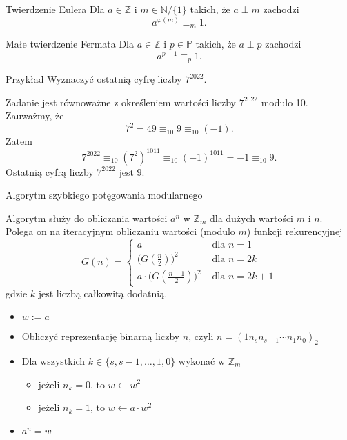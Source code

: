 \documentclass[a4paper,10pt]{beamer}
\begin{document}
\begin{frame}
	
	\begin{block}{Twierdzenie Eulera}
		Dla $a\in\mathbb{Z}$ i $m\in\mathbb{N}/\{1\}$ takich, że $a\perp m$ zachodzi
		$$a^{\varphi(m)}\equiv_m1.$$
	\end{block}

	\begin{block}{Małe twierdzenie Fermata}
		Dla $a\in\mathbb{Z}$ i $p\in\mathbb{P}$ takich, że $a\perp p$ zachodzi
		$$a^{p-1}\equiv_p1.$$
	\end{block}

	\begin{exampleblock}{Przykład}
	Wyznaczyć ostatnią cyfrę liczby $7^{2022}$.
	
	Zadanie jest równoważne z określeniem wartości liczby $7^{2022}$ modulo 10.
	Zauważmy, że 
	$$7^2=49\equiv_{10}9\equiv_{10}(-1).$$
	Zatem $$7^{2022}\equiv_{10}(7^2)^{1011}\equiv_{10}(-1)^{1011}=-1\equiv_{10}9.$$
	Ostatnią cyfrą liczby $7^{2022}$ jest $9$.
\end{exampleblock}

\end{frame}




\begin{frame}{Algorytm szybkiego potęgowania modularnego}
	
	Algorytm służy do obliczania wartości $a^n$ w $\mathbb{Z}_m$ dla dużych wartości $m$ i $n$. Polega on na iteracyjnym obliczaniu wartości (modulo $m$) funkcji rekurencyjnej
	$$G(n)=\left\{
	\begin{array}{cl}a&\mbox{ dla }n=1\\
	\Big(G\left(\frac{n}{2}\right)\Big)^2&\mbox{ dla }n=2k\\
	a\cdot\Big(G\left(\frac{n-1}{2}\right)\Big)^2&\mbox{ dla }n=2k+1
	\end{array}
	\right.$$
	gdzie $k$ jest liczbą całkowitą dodatnią.
	
	\begin{block}{}
		\begin{itemize}
			\item $w:=a$
			\item Obliczyć reprezentację binarną liczby $n$, czyli $n=(1n_sn_{s-1}\cdots n_1n_0)_2$
			\item Dla wszystkich $k\in\{s,s-1,\ldots,1,0\}$ wykonać w $\mathbb{Z}_m$
			\begin{itemize}
				\item jeżeli $n_k=0$, to $w\leftarrow w^2$
				\item jeżeli $n_k=1$, to $w\leftarrow a\cdot w^2$
			\end{itemize}
			\item $a^n=w$
		\end{itemize}
	\end{block}
	
\end{frame}
\end{document}
